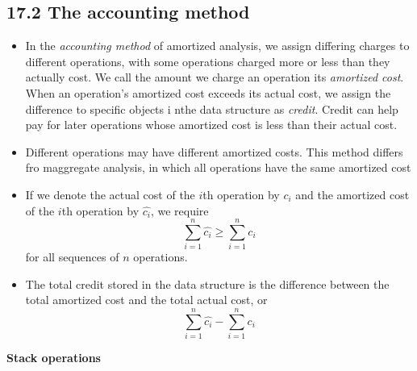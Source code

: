 \documentclass{report}
\begin{document}
\subsection*{17.2 The accounting method}
\begin{itemize}
    \item In the \textit{accounting method} of amortized analysis, we assign differing charges to different operations, with some operations charged more or less than they actually cost. We call the amount we charge an operation its \textit{amortized cost}. When an operation's amortized cost exceeds its actual cost, we assign the difference to specific objects i nthe data structure as \textit{credit}. Credit can help pay for later operations whose amortized cost is less than their actual cost.
    \item Different operations may have different amortized costs. This method differs fro maggregate analysis, in which all operations have the same amortized cost
    \item If we denote the actual cost of the $i$th operation by $c_i$ and the amortized cost of the $i$th operation by $\hat{c_i}$, we require
    $$\sum_{i = 1}^n \hat{c_i} \geq \sum_{i = 1}^n c_i$$
    for all sequences of $n$ operations.
    \item The total credit stored in the data structure is the difference between the total amortized cost and the total actual cost, or
    $$\sum^n _{i = 1} \hat{c_i} - \sum^n _{i = 1} c_i$$
\end{itemize}
\textbf{Stack operations}
\end{document}
